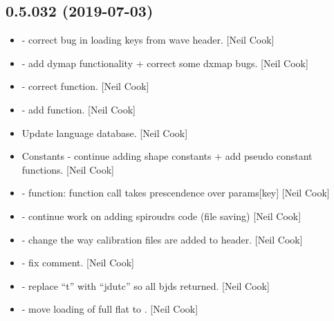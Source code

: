 \documentclass[a4paper,10pt,english]{report}
\begin{document}
\subsection{0.5.032 (2019-07-03)}
\label{\detokenize{misc/changelog:id106}}\begin{itemize}
\item {} 
 - correct bug in loading keys from wave header.
{[}Neil Cook{]}

\item {} 
 - add dymap functionality + correct some dxmap
bugs. {[}Neil Cook{]}

\item {} 
 - correct  function.
{[}Neil Cook{]}

\item {} 
 - add  function. {[}Neil
Cook{]}

\item {} 
Update language database. {[}Neil Cook{]}

\item {} 
Constants - continue adding shape constants + add pseudo constant
functions. {[}Neil Cook{]}

\item {} 
 -  function: function call takes prescendence
over params{[}key{]} {[}Neil Cook{]}

\item {} 
 - continue work on adding spiroudrs code
(file saving) {[}Neil Cook{]}

\item {} 
 - change the way calibration files are added to
header. {[}Neil Cook{]}

\item {} 
 - fix comment. {[}Neil Cook{]}

\item {} 
 - replace “t” with “jdutc” so all bjds returned. {[}Neil
Cook{]}

\item {} 
 - move loading of full flat to
. {[}Neil Cook{]}


\end{itemize}
\end{document}
